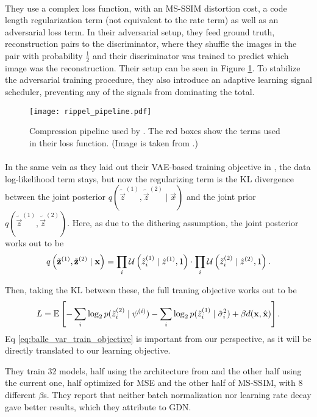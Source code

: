 \paragraph{\cite{rippel2017real}} They use a complex loss function, with an MS-SSIM
distortion cost, a code length regularization term (not equivalent to the rate
term) as well as an adversarial loss term. In their adversarial setup, they feed
ground truth, reconstruction pairs to the discriminator, where they shuffle the
images in the pair with probability $\frac12$ and their discriminator was
trained to predict which image was the reconstruction. Their setup can be seen
in Figure \ref{fig:rippel_pipeline}. To stabilize the
adversarial training procedure, they also introduce an adaptive learning signal
scheduler, preventing any of the signals from dominating the total.
\begin{figure}
  \centering 
  \texttt{[image: rippel\_pipeline.pdf]}
  \caption[Compression pipeline used by \cite{rippel2017real}.]
  {Compression pipeline used by \cite{rippel2017real}. The red boxes
    show the terms used in their loss function. (Image is taken from
    \cite{rippel2017real}.)}
  \label{fig:rippel_pipeline}
\end{figure}

\paragraph{\cite{balle2018variational}} In the same vein as they laid out their
  VAE-based training objective in \cite{balle2016end}, the data log-likelihood
  term stays, but now the regularizing term is the KL divergence between the
  joint posterior $q(\tilde{\vec{z}}^{(1)}, \tilde{\vec{z}}^{(2)} \mid \vec{x})$
  and the joint prior 
  $q(\tilde{\vec{z}}^{(1)}, \tilde{\vec{z}}^{(2)})$. Here, as due to the
  dithering assumption, the joint posterior works out to be
  \[
    q\left(\tilde{\mathbf{z}}^{(1)}, \tilde{\mathbf{z}}^{(2)} \mid \mathbf{x}\right) =
    \prod_i \mathcal{U}\left( \tilde{z}^{(1)}_i \mid \hat{z}^{(1)}, 1 \right) \cdot
    \prod_i \mathcal{U}\left( \tilde{z}^{(2)}_i \mid \hat{z}^{(2)}, 1 \right).
  \]
  \par
  Then, taking the KL between these, the full traning objective works out to be
  \begin{equation}
    \label{eq:balle_var_train_objective}
    L = \mathbb{E}_{}\left[  -\sum_i \log_2 p(\tilde{z}^{(2)}_i \mid \psi^{(i)}) 
      -\sum_i \log_2 p(\tilde{z}^{(1)}_i \mid \tilde{\sigma}^2_i) +
      \beta d(\mathbf{x}, \hat{\mathbf{x}}) \right].
  \end{equation}
  Eq \ref{eq:balle_var_train_objective} is important from our perspective, as
  it will be
  directly translated to our learning objective.
  \par
  They train 32 models, half using the architecture from \cite{balle2016end} and
  the other half using the current one, half optimized for MSE and the other
  half of MS-SSIM, with 8
  different $\beta$s. They report that neither batch normalization nor learning
  rate decay gave better results, which they attribute to GDN.


